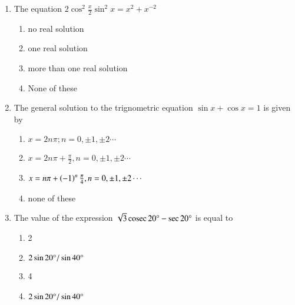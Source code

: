 \documentclass[journal,12pt,twocolumn]{IEEEtran}
\theoremstyle{remark}
\begin{document}
\begin{enumerate}
	\item The equation $2\cos^{2}\frac{x}{2}\sin^{2}x = x^{2} +x^{-2}$  
		\hfill{}
      
		\begin{enumerate}
			\item no real solution
	  		\item one real solution
			\item more than one real solution 
			\item None of these
		\end{enumerate}
  


	\item The general solution to the trignometric equation $ \sin x + \cos x = 1$ is given by
		\hfill{}
  
		\begin{enumerate}
			\item $x=2n\pi;n=0,\pm1,\pm2 \cdots$
			\item  $x = 2n\pi + \frac{\pi}{2}, n = 0, \pm 1, \pm 2 \cdots $
			\item $x=n\pi+\left(-1\right)^{n}\frac{\pi}{4},n = 0,\pm 1,\pm 2 \cdots $ 
			\item none of these
		\end{enumerate}
  


	\item The value of the expression $\sqrt{3}\,\text{cosec}\, 20\degree - \sec 20\degree $ is equal to 
		\hfill{}
  
			\begin{enumerate}
				\item 2 
  				\item $2\sin 20\degree/\sin 40\degree$
  				\item 4 
				\item $2\sin 20\degree/\sin 40\degree $
			\end{enumerate}
  
  
\end{enumerate}
\end{document}
